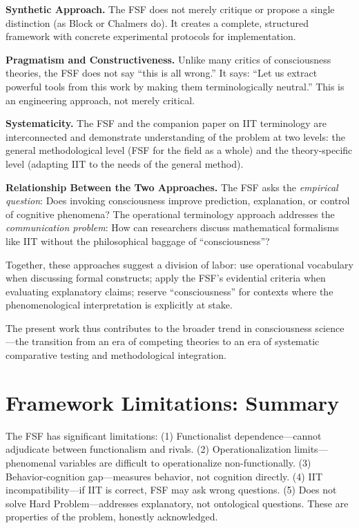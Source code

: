 \documentclass[12pt,a4paper]{article}
\begin{document}
\textbf{Synthetic Approach.} The FSF does not merely critique or propose a single distinction (as Block or Chalmers do). It creates a complete, structured framework with concrete experimental protocols for implementation.

\textbf{Pragmatism and Constructiveness.} Unlike many critics of consciousness theories, the FSF does not say ``this is all wrong.'' It says: ``Let us extract powerful tools from this work by making them terminologically neutral.'' This is an engineering approach, not merely critical.

\textbf{Systematicity.} The FSF and the companion paper on IIT terminology are interconnected and demonstrate understanding of the problem at two levels: the general methodological level (FSF for the field as a whole) and the theory-specific level (adapting IIT to the needs of the general method).

\textbf{Relationship Between the Two Approaches.} The FSF asks the \textit{empirical question}: Does invoking consciousness improve prediction, explanation, or control of cognitive phenomena? The operational terminology approach addresses the \textit{communication problem}: How can researchers discuss mathematical formalisms like IIT without the philosophical baggage of ``consciousness''?

Together, these approaches suggest a division of labor: use operational vocabulary when discussing formal constructs; apply the FSF's evidential criteria when evaluating explanatory claims; reserve ``consciousness'' for contexts where the phenomenological interpretation is explicitly at stake.

The present work thus contributes to the broader trend in consciousness science---the transition from an era of competing theories to an era of systematic comparative testing and methodological integration.

\section{Framework Limitations: Summary}

The FSF has significant limitations: (1) Functionalist dependence---cannot adjudicate between functionalism and rivals. (2) Operationalization limits---phenomenal variables are difficult to operationalize non-functionally. (3) Behavior-cognition gap---measures behavior, not cognition directly. (4) IIT incompatibility---if IIT is correct, FSF may ask wrong questions. (5) Does not solve Hard Problem---addresses explanatory, not ontological questions. These are properties of the problem, honestly acknowledged.
\end{document}
